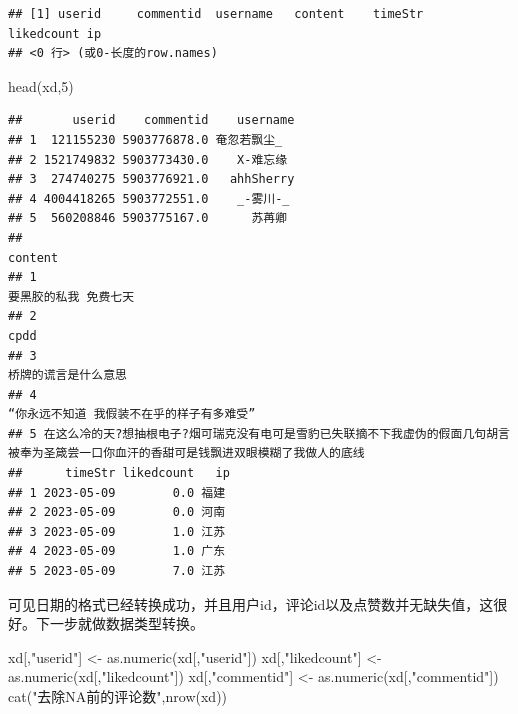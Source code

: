 \documentclass[
]{article}
\newenvironment{Shaded}{\begin{snugshade}}{\end{snugshade}}
\newcommand{\DecValTok}[1]{\textcolor[rgb]{0.00,0.00,0.81}{#1}}
\newcommand{\FunctionTok}[1]{\textcolor[rgb]{0.00,0.00,0.00}{#1}}
\newcommand{\NormalTok}[1]{#1}
\newcommand{\OtherTok}[1]{\textcolor[rgb]{0.56,0.35,0.01}{#1}}
\newcommand{\StringTok}[1]{\textcolor[rgb]{0.31,0.60,0.02}{#1}}
\begin{document}
\begin{verbatim}
## [1] userid     commentid  username   content    timeStr    likedcount ip        
## <0 行> (或0-长度的row.names)
\end{verbatim}

\begin{Shaded}
\begin{Highlighting}[]
\FunctionTok{head}\NormalTok{(xd,}\DecValTok{5}\NormalTok{)}
\end{Highlighting}
\end{Shaded}

\begin{verbatim}
##       userid    commentid    username
## 1  121155230 5903776878.0 奄忽若飘尘_
## 2 1521749832 5903773430.0    X-难忘缘
## 3  274740275 5903776921.0   ahhSherry
## 4 4004418265 5903772551.0    _-雾川-_
## 5  560208846 5903775167.0      苏苒卿
##                                                                                                                                      content
## 1                                                                                                                      要黑胶的私我 免费七天
## 2                                                                                                                                       cpdd
## 3                                                                                                                       桥牌的谎言是什么意思
## 4                                                                                                  “你永远不知道 我假装不在乎的样子有多难受”
## 5 在这么冷的天?想抽根电子?烟可瑞克没有电可是雪豹已失联摘不下我虚伪的假面几句胡言被奉为圣箴尝一口你血汗的香甜可是钱飘进双眼模糊了我做人的底线
##      timeStr likedcount   ip
## 1 2023-05-09        0.0 福建
## 2 2023-05-09        0.0 河南
## 3 2023-05-09        1.0 江苏
## 4 2023-05-09        1.0 广东
## 5 2023-05-09        7.0 江苏
\end{verbatim}

可见日期的格式已经转换成功，并且用户id，评论id以及点赞数并无缺失值，这很好。下一步就做数据类型转换。

\begin{Shaded}
\begin{Highlighting}[]
\NormalTok{xd[,}\StringTok{"userid"}\NormalTok{] }\OtherTok{\textless{}{-}} \FunctionTok{as.numeric}\NormalTok{(xd[,}\StringTok{"userid"}\NormalTok{])}
\NormalTok{xd[,}\StringTok{"likedcount"}\NormalTok{] }\OtherTok{\textless{}{-}} \FunctionTok{as.numeric}\NormalTok{(xd[,}\StringTok{"likedcount"}\NormalTok{])}
\NormalTok{xd[,}\StringTok{"commentid"}\NormalTok{] }\OtherTok{\textless{}{-}} \FunctionTok{as.numeric}\NormalTok{(xd[,}\StringTok{"commentid"}\NormalTok{])}
\FunctionTok{cat}\NormalTok{(}\StringTok{"去除NA前的评论数"}\NormalTok{,}\FunctionTok{nrow}\NormalTok{(xd))}
\end{Highlighting}
\end{Shaded}
\end{document}
